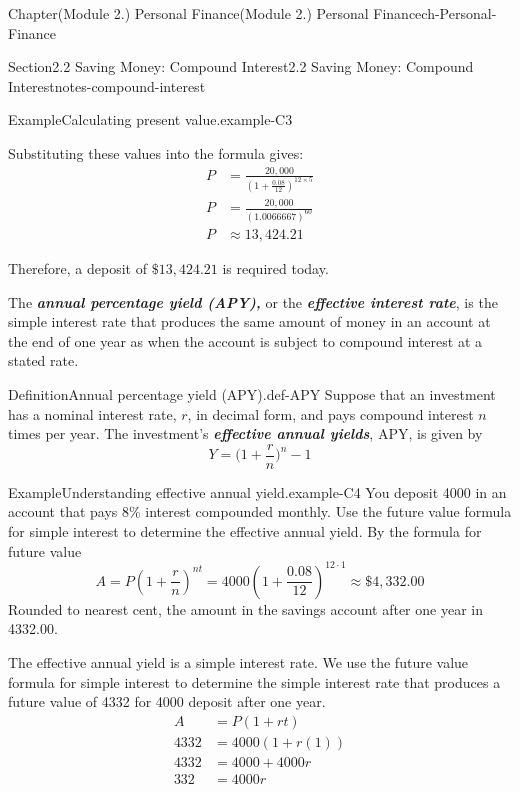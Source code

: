 \documentclass[oneside,10pt,]{book}
\newcommand{\alert}[1]{\textbf{\textit{#1}}}
\newcommand{\amp}{&}
\begin{document}
\begin{chapterptx}{Chapter}{(Module 2.) Personal Finance}{}{(Module 2.) Personal Finance}{}{}{ch-Personal-Finance}
\begin{sectionptx}{Section}{2.2 Saving Money: Compound Interest}{}{2.2 Saving Money: Compound Interest}{}{}{notes-compound-interest}
\begin{example}{Example}{Calculating present value.}{example-C3}
%
\par
Substituting these values into the formula gives:%
\begin{align*}
P \amp = \frac{20,000}{(1 + \frac{0.08}{12})^{12 \times 5}}\\
P \amp = \frac{20,000}{(1.0066667)^{60}}\\
P \amp \approx 13,424.21
\end{align*}
%
\par
Therefore, a deposit of \(\$13,424.21\) is required today.%
\end{example}
The \alert{annual percentage yield (APY),} or the \alert{effective interest rate}, is the simple interest rate that produces the same amount of money in an account at the end of one year as when the account is subject to compound interest at a stated rate.%
\begin{definition}{Definition}{Annual percentage yield (APY).}{def-APY}%
Suppose that an investment has a nominal interest rate, \(r\), in decimal form, and pays compound interest \(n\) times per year. The investment's \alert{effective annual yields}, APY, is given by%
\begin{equation}
Y=\bigl( 1+\frac{r}{n}\bigr)^{n}-1\label{eqn-APY-formula}
\end{equation}
%
\end{definition}
\begin{example}{Example}{Understanding effective annual yield.}{example-C4}%
You deposit \textdollar{}4000 in an account that pays 8\% interest compounded monthly. Use the future value formula for simple interest to determine the effective annual yield.%
\noindent\hypertarget{example-C4-3}{}By the formula for future value%
\begin{equation*}
A = P(1+ \dfrac{r}{n})^{nt}=4000(1+\dfrac{0.08}{12})^{12 \cdot 1}\approx \$4,332.00
\end{equation*}
Rounded to nearest cent, the amount in the savings account after one year in \textdollar{}4332.00.%
\par
The effective annual yield is a simple interest rate. We use the future value formula for simple interest to determine the simple interest rate that produces a future value of \textdollar{}4332 for \textdollar{}4000 deposit after one year.%
%
\begin{align*}
A \amp = P(1+rt) \\
4332 \amp = 4000(1+r(1)) \\
4332 \amp = 4000+4000r \\
332 \amp = 4000r \\

\end{align*}
\end{example}
\end{sectionptx}
\end{chapterptx}
\end{document}
